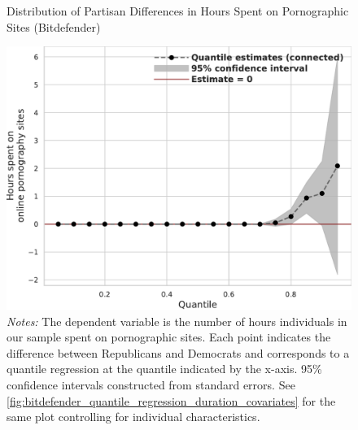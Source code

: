 \documentclass[12pt,twoside]{article}
\begin{document}
\begin{figure}[t]
	\centering
	\caption{Distribution of Partisan Differences in Hours Spent on Pornographic Sites (Bitdefender)}
	\includegraphics[width=.7\linewidth]{figs/bitdefender_quantile_reg_duration_adult.pdf}
	\caption*{\footnotesize \emph{Notes:} 
		The dependent variable is the number of hours individuals in our sample spent on pornographic sites.
		Each point indicates the difference between Republicans and Democrats and corresponds to a quantile regression at the quantile indicated by the x-axis.
		95\% confidence intervals constructed from standard errors.
		See \cref{fig:bitdefender_quantile_regression_duration_covariates} for the same plot controlling for individual characteristics.
	}
	\label{fig:bitdefender_quantile_regression_duration}
\end{figure}
\end{document}
